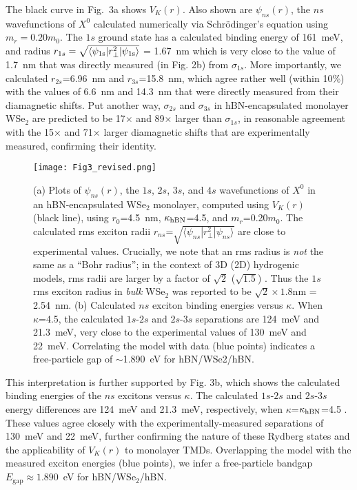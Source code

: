 \documentclass[aps,prl,twocolumn]{revtex4-1}
\begin{document}
The black curve in Fig.~3a shows $V_K(r)$. Also shown are $\psi_{ns}(r)$, the $ns$ wavefunctions of $X^0$ calculated numerically via Schr\"odinger's equation using $m_r = 0.20 m_0$. The $1s$ ground state has a calculated binding energy of 161~meV, and radius $r_{1s} = \sqrt{\langle \psi_{\rm 1s} |r_\perp^2 | \psi_{\rm 1s} \rangle}$ = 1.67~nm which is very close to the value of 1.7~nm that was directly measured (in Fig. 2b) from $\sigma_{1s}$.  More importantly, we calculated $r_{2s}$=6.96~nm and $r_{3s}$=15.8~nm, which agree rather well (within 10\%) with the values of 6.6~nm and 14.3~nm that were directly measured from their diamagnetic shifts. Put another way, $\sigma_{2s}$ and $\sigma_{3s}$ in hBN-encapsulated monolayer WSe$_2$ are predicted to be 17$\times$ and 89$\times$ larger than $\sigma_{1s}$, in reasonable agreement with the 15$\times$ and 71$\times$ larger diamagnetic shifts that are experimentally measured, confirming their identity.

\begin{figure}[tbp]
\center
\texttt{[image: Fig3\_revised.png]}
\caption{(a) Plots of $\psi_{ns}(r)$, the $1s$, $2s$, $3s$, and $4s$ wavefunctions of $X^0$ in an hBN-encapsulated WSe$_2$ monolayer, computed using $V_K(r)$ (black line), using $r_0$=4.5~nm, $\kappa_{\rm hBN}$=4.5, and $m_r$=0.20$m_0$. The calculated rms exciton radii $r_{ns}$=$\sqrt{\langle \psi_{ns} | r_\perp^2 | \psi_{ns} \rangle}$ are close to experimental values. Crucially, we note that an rms radius is \textit{not} the same as a ``Bohr radius''; in the context of 3D (2D) hydrogenic models, rms radii are larger by a factor of $\sqrt{2}$ ($\sqrt{1.5}$) \cite{Stier_NatComm}. Thus the $1s$ rms exciton radius in \textit{bulk} WSe$_2$ was reported \cite{Beal1976} to be $\sqrt{2} \times 1.8$nm = 2.54~nm. (b) Calculated $ns$ exciton binding energies versus $\kappa$.  When $\kappa$=4.5, the calculated $1s$-$2s$ and $2s$-$3s$ separations are 124~meV and 21.3~meV, very close to the experimental values of 130~meV and 22~meV. Correlating the model with data (blue points) indicates a free-particle gap of $\sim$1.890~eV for hBN/WSe2/hBN.}
\label{fig3}
\end{figure}

This interpretation is further supported by Fig. 3b, which shows the calculated binding energies of the $ns$ excitons versus $\kappa$. The calculated $1s$-$2s$ and $2s$-$3s$ energy differences are 124~meV and 21.3~meV, respectively, when $\kappa$=$\kappa_{\rm hBN}$=4.5 \cite{Geick}. These values agree closely with the experimentally-measured separations of 130~meV and 22~meV, further confirming the nature of these Rydberg states and the applicability of $V_K(r)$ to monolayer TMDs. Overlapping the model with the measured exciton energies (blue points), we infer a free-particle bandgap $E_{\textrm{gap}} \approx 1.890$~eV for hBN/WSe$_2$/hBN.
\end{document}
